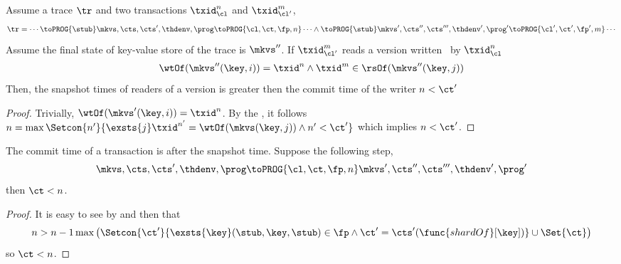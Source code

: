 \begin{lemma}
    \label{lem:clock-si-reader-greater-than-writer}
    Assume a trace \( \tr \) and two transactions \( \txid_{\cl}^n\) and \( \txid_{\cl'}^m \),
        \[
            \begin{array}{@{}l@{}}
                \tr = \cdots \toPROG{\stub} \mkvs,\cts,\cts',\thdenv, \prog \toPROG{\cl,\ct,\fp,n} \cdots \land
                \toPROG{\stub} \mkvs',\cts'',\cts''',\thdenv', \prog' \toPROG{\cl',\ct',\fp',m} \cdots
            \end{array}
        \]
    Assume the final state of key-value store of the trace is \( \mkvs'' \).
    If  \( \txid_{\cl'}^m \) reads a version written \ by \( \txid_{\cl}^n\)
    \[
        \begin{array}{@{}l@{}}
            \wtOf(\mkvs''(\key,i)) = \txid^n 
            \land \txid^m \in \rsOf(\mkvs''(\key,j))
        \end{array}
    \]
    Then, the snapshot times of readers of a version is greater then the commit time of the writer \( n < \ct' \)
\end{lemma}
\begin{proof}
    Trivially, \( \wtOf(\mkvs'(\key,i)) = \txid^n \).
    By the , it follows \( n  = \max\Setcon{n'}{ \exsts{j} \txid^{n'} = \wtOf(\mkvs(\key, j)) \land n' < \ct' } \) which implies \( n < \ct' \).
\end{proof}


\begin{lemma}
    \label{lem:commit-after-snapshot-time}
    The commit time of a transaction is after the snapshot time.
    Suppose the following step,
    \[
        \mkvs,\cts,\cts',\thdenv, \prog \toPROG{\cl,\ct,\fp,n} \mkvs',\cts'',\cts''',\thdenv', \prog'
    \]
    then \( \ct < n \).
\end{lemma}
\begin{proof}
    It is easy to see by  and then  that 
    \[
        n > n - 1 \max\left( \Setcon{\ct'}{\exsts{\key} (\stub, \key, \stub) \in \fp \land \ct' = \cts'(\func{shardOf}[\key])} \cup \Set{\ct} \right)
    \]
    so \( \ct < n \).
\end{proof}


